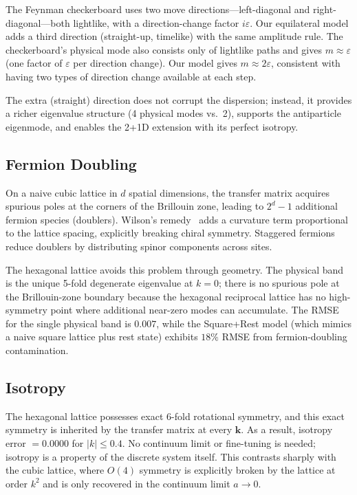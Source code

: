 \documentclass[twocolumn,showpacs,preprintnumbers,amsmath,amssymb]{revtex4-2}
\newcommand{\eps}{\varepsilon}
\begin{document}
The Feynman checkerboard uses two move directions---left-diagonal and
right-diagonal---both lightlike, with a direction-change factor $i\eps$.
Our equilateral model adds a third direction (straight-up, timelike) with the
same amplitude rule.
The checkerboard's physical mode also consists only of lightlike paths and
gives $m \approx \eps$ (one factor of $\eps$ per direction change).
Our model gives $m \approx 2\eps$, consistent with having two types of
direction change available at each step.

The extra (straight) direction does not corrupt the dispersion; instead, it
provides a richer eigenvalue structure (4 physical modes vs.\ 2), supports
the antiparticle eigenmode, and enables the 2+1D extension with its perfect
isotropy.

\subsection{Fermion Doubling}

On a naive cubic lattice in $d$ spatial dimensions, the transfer matrix
acquires spurious poles at the corners of the Brillouin zone, leading to
$2^d - 1$ additional fermion species (doublers).
Wilson's remedy~\cite{wilson1974} adds a curvature term proportional to
the lattice spacing, explicitly breaking chiral symmetry.
Staggered fermions~\cite{susskind1977} reduce doublers by distributing
spinor components across sites.

The hexagonal lattice avoids this problem through geometry.
The physical band is the unique 5-fold degenerate eigenvalue at $k = 0$;
there is no spurious pole at the Brillouin-zone boundary
because the hexagonal reciprocal lattice has no high-symmetry point
where additional near-zero modes can accumulate.
The RMSE for the single physical band is $0.007$, while the Square+Rest
model (which mimics a naive square lattice plus rest state) exhibits
$18\%$ RMSE from fermion-doubling contamination.

\subsection{Isotropy}

The hexagonal lattice possesses exact 6-fold rotational symmetry, and this
exact symmetry is inherited by the transfer matrix at every $\mathbf{k}$.
As a result, isotropy error $= 0.0000$ for $|k| \le 0.4$.
No continuum limit or fine-tuning is needed; isotropy is a property of the
discrete system itself.
This contrasts sharply with the cubic lattice, where $O(4)$ symmetry is
explicitly broken by the lattice at order $k^2$ and is only recovered in the
continuum limit $a \to 0$.
\end{document}
